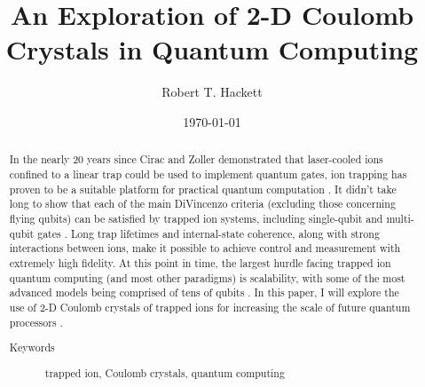 \title{An Exploration of 2-D Coulomb Crystals in Quantum Computing}%

\author{Robert T. Hackett}
%




\date{\today}%

\begin{abstract}
In the nearly 20 years since Cirac and Zoller demonstrated that laser-cooled ions confined to a linear trap could be used to implement quantum gates, ion trapping has proven to be a suitable platform for practical quantum computation \cite{Cirac}. It didn't take long to show that each of the main DiVincenzo criteria (excluding those concerning flying qubits) can be satisfied by trapped ion systems, including single-qubit and multi-qubit gates \cite{Bruzewicz}. Long trap lifetimes and internal-state coherence, along with strong interactions between ions, make it possible to achieve control and measurement with extremely high fidelity. At this point in time, the largest hurdle facing trapped ion quantum computing (and most other paradigms) is scalability, with some of the most advanced models being comprised of tens of qubits \cite{Moses}. In this paper, I will explore the use of 2-D Coulomb crystals of trapped ions for increasing the scale of future quantum processors \cite{Kato, Kiesenhofer}.
\begin{description}
\item[Keywords]
trapped ion, Coulomb crystals, quantum computing
\end{description}
\end{abstract}

\maketitle